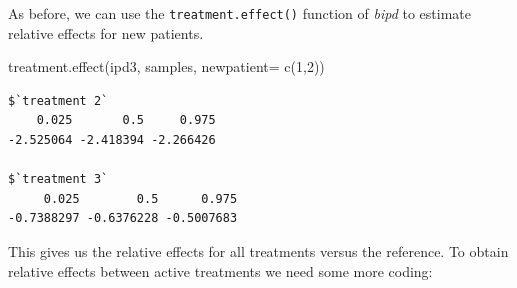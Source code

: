 \documentclass[
  letterpaper,
  DIV=11,
  numbers=noendperiod]{scrreprt}
\newenvironment{Shaded}{\begin{snugshade}}{\end{snugshade}}
\newcommand{\AttributeTok}[1]{\textcolor[rgb]{0.40,0.45,0.13}{#1}}
\newcommand{\DecValTok}[1]{\textcolor[rgb]{0.68,0.00,0.00}{#1}}
\newcommand{\FloatTok}[1]{\textcolor[rgb]{0.68,0.00,0.00}{#1}}
\newcommand{\FunctionTok}[1]{\textcolor[rgb]{0.28,0.35,0.67}{#1}}
\newcommand{\NormalTok}[1]{\textcolor[rgb]{0.00,0.23,0.31}{#1}}
\newcommand{\OtherTok}[1]{\textcolor[rgb]{0.00,0.23,0.31}{#1}}
\newcommand{\SpecialCharTok}[1]{\textcolor[rgb]{0.37,0.37,0.37}{#1}}
\begin{document}
As before, we can use the \texttt{treatment.effect()} function of
\emph{bipd} to estimate relative effects for new patients.

\begin{Shaded}
\begin{Highlighting}[]
\FunctionTok{treatment.effect}\NormalTok{(ipd3, samples, }\AttributeTok{newpatient=} \FunctionTok{c}\NormalTok{(}\DecValTok{1}\NormalTok{,}\DecValTok{2}\NormalTok{))}
\end{Highlighting}
\end{Shaded}

\begin{verbatim}
$`treatment 2`
    0.025       0.5     0.975 
-2.525064 -2.418394 -2.266426 

$`treatment 3`
     0.025        0.5      0.975 
-0.7388297 -0.6376228 -0.5007683 
\end{verbatim}

This gives us the relative effects for all treatments versus the
reference. To obtain relative effects between active treatments we need
some more coding:

\begin{Shaded}
\end{Shaded}
\end{document}
